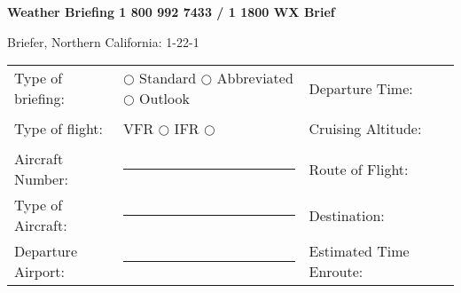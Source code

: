 \documentclass[10pt]{letter}
\newcommand{\uscore}[0]{\rule{3cm}{0.4pt}}
\begin{document}
\pagestyle{empty}

\begin{center}
\textbf{Weather Briefing 1 800 992 7433 / 1 1800 WX Brief} \begin{footnotesize}{Briefer, Northern California: 1-22-1}\end{footnotesize}

\begin{tabular}{lllc}
\hline Type of briefing: & $\bigcirc$ Standard $\bigcirc$ Abbreviated $\bigcirc$ Outlook & Departure Time: & \uscore \\
Type of flight: & VFR $\bigcirc$ IFR $\bigcirc$ & Cruising Altitude: & \uscore \\
Aircraft Number: & \uscore & Route of Flight: & \uscore \\
Type of Aircraft: & \uscore & Destination: & \uscore \\ 
Departure Airport: & \uscore & Estimated Time Enroute: & \uscore \\\hline
\end{tabular}
\end{center}
\end{document}
